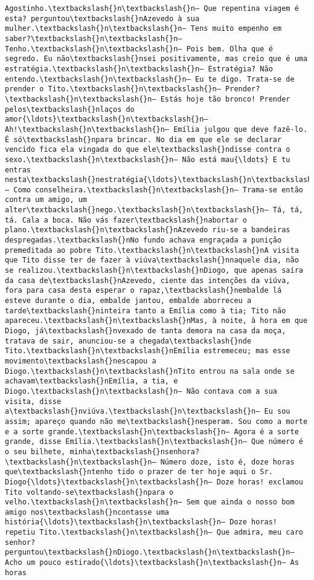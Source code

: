\begin{Verbatim}[commandchars=\\\{\}]
Agostinho.\textbackslash{}n\textbackslash{}n— Que repentina viagem é esta? perguntou\textbackslash{}nAzevedo à sua mulher.\textbackslash{}n\textbackslash{}n— Tens muito empenho em saber?\textbackslash{}n\textbackslash{}n— Tenho.\textbackslash{}n\textbackslash{}n— Pois bem. Olha que é segredo. Eu não\textbackslash{}nsei positivamente, mas creio que é uma estratégia.\textbackslash{}n\textbackslash{}n— Estratégia? Não entendo.\textbackslash{}n\textbackslash{}n— Eu te digo. Trata-se de prender o Tito.\textbackslash{}n\textbackslash{}n— Prender?\textbackslash{}n\textbackslash{}n— Estás hoje tão bronco! Prender pelos\textbackslash{}nlaços do amor{\ldots}\textbackslash{}n\textbackslash{}n— Ah!\textbackslash{}n\textbackslash{}n— Emília julgou que deve fazê-lo. É só\textbackslash{}npara brincar. No dia em que ele se declarar vencido fica ela vingada do que ele\textbackslash{}ndisse contra o sexo.\textbackslash{}n\textbackslash{}n— Não está mau{\ldots} E tu entras nesta\textbackslash{}nestratégia{\ldots}\textbackslash{}n\textbackslash{}n— Como conselheira.\textbackslash{}n\textbackslash{}n— Trama-se então contra um amigo, um alter\textbackslash{}nego.\textbackslash{}n\textbackslash{}n— Tá, tá, tá. Cala a boca. Não vás fazer\textbackslash{}nabortar o plano.\textbackslash{}n\textbackslash{}nAzevedo riu-se a bandeiras despregadas.\textbackslash{}nNo fundo achava engraçada a punição premeditada ao pobre Tito.\textbackslash{}n\textbackslash{}nA visita que Tito disse ter de fazer à viúva\textbackslash{}nnaquele dia, não se realizou.\textbackslash{}n\textbackslash{}nDiogo, que apenas saíra da casa de\textbackslash{}nAzevedo, ciente das intenções da viúva, fora para casa desta esperar o rapaz,\textbackslash{}nembalde lá esteve durante o dia, embalde jantou, embalde aborreceu a tarde\textbackslash{}ninteira tanto a Emília como à tia; Tito não apareceu.\textbackslash{}n\textbackslash{}nMas, à noite, à hora em que Diogo, já\textbackslash{}nvexado de tanta demora na casa da moça, tratava de sair, anunciou-se a chegada\textbackslash{}nde Tito.\textbackslash{}n\textbackslash{}nEmília estremeceu; mas esse movimento\textbackslash{}nescapou a Diogo.\textbackslash{}n\textbackslash{}nTito entrou na sala onde se achavam\textbackslash{}nEmília, a tia, e Diogo.\textbackslash{}n\textbackslash{}n— Não contava com a sua visita, disse a\textbackslash{}nviúva.\textbackslash{}n\textbackslash{}n— Eu sou assim; apareço quando não me\textbackslash{}nesperam. Sou como a morte e a sorte grande.\textbackslash{}n\textbackslash{}n— Agora é a sorte grande, disse Emília.\textbackslash{}n\textbackslash{}n— Que número é o seu bilhete, minha\textbackslash{}nsenhora?\textbackslash{}n\textbackslash{}n— Número doze, isto é, doze horas que\textbackslash{}ntenho tido o prazer de ter hoje aqui o Sr. Diogo{\ldots}\textbackslash{}n\textbackslash{}n— Doze horas! exclamou Tito voltando-se\textbackslash{}npara o velho.\textbackslash{}n\textbackslash{}n— Sem que ainda o nosso bom amigo nos\textbackslash{}ncontasse uma história{\ldots}\textbackslash{}n\textbackslash{}n— Doze horas! repetiu Tito.\textbackslash{}n\textbackslash{}n— Que admira, meu caro senhor? perguntou\textbackslash{}nDiogo.\textbackslash{}n\textbackslash{}n— Acho um pouco estirado{\ldots}\textbackslash{}n\textbackslash{}n— As horas 
\end{Verbatim}
